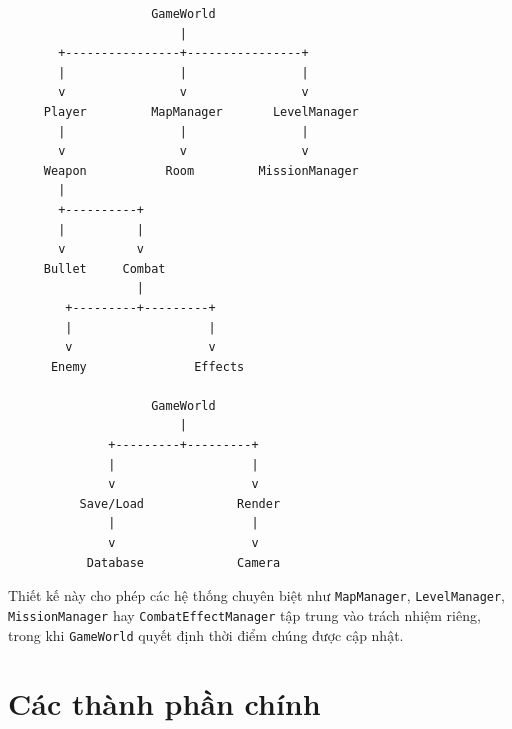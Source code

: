\documentclass[12pt,a4paper]{report}
\begin{document}
    \begin{verbatim}
                    GameWorld
                        |
       +----------------+----------------+
       |                |                |
       v                v                v
     Player         MapManager       LevelManager
       |                |                |
       v                v                v
     Weapon           Room         MissionManager
       |
       +----------+
       |          |
       v          v
     Bullet     Combat
                  |
        +---------+---------+
        |                   |
        v                   v
      Enemy               Effects

                    GameWorld
                        |
              +---------+---------+
              |                   |
              v                   v
          Save/Load             Render
              |                   |
              v                   v
           Database             Camera
    \end{verbatim}

    Thiết kế này cho phép các hệ thống chuyên biệt như
    \texttt{MapManager}, \texttt{LevelManager},
    \texttt{MissionManager} hay \texttt{CombatEffectManager}
    tập trung vào trách nhiệm riêng, trong khi
    \texttt{GameWorld} quyết định thời điểm chúng được cập nhật.


    \section{Các thành phần chính}
\end{document}
